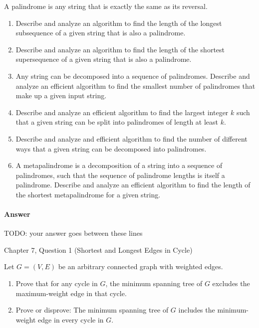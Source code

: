 \documentclass{article}
\begin{document}
A palindrome is any string that is exactly the same as its reversal.
\begin{enumerate}[label=(\alph*)]
    \item Describe and analyze an algorithm to find the length of the longest subsequence of a given string that is also a palindrome.
    \item Describe and analyze an algorithm to find the length of the shortest supersequence of a given string that is also a palindrome.
    \item Any string can be decomposed into a sequence of palindromes.
    Describe and analyze an efficient algorithm to find the smallest number of palindromes that make up a given input string.
    \item Describe and analyze an efficient algorithm to find the largest integer $k$ such that a given string can be split into palindromes of length at least $k$.
    \item Describe and analyze and efficient algorithm to find the number of different ways that a given string can be decomposed into palindromes.
    \item A metapalindrome is a decomposition of a string into a sequence of palindromes, such that the sequence of palindrome lengths is itself a palindrome.
    Describe and analyze an efficient algorithm to find the length of the shortest metapalindrome for a given string.
\end{enumerate}

\paragraph{Answer}


TODO: your answer goes between these lines


\nextprob
{}

Chapter 7, Question 1 (Shortest and Longest Edges in Cycle)

Let $G = (V, E)$ be an arbitrary connected graph with weighted edges.
\begin{enumerate}[label=(\alph*)]
    \item Prove that for any cycle in $G$, the minimum spanning tree of $G$ excludes the maximum-weight edge in that cycle.
    \item Prove or disprove: The minimum spanning tree of $G$ includes the minimum-weight edge in every cycle in $G$.
\end{enumerate}
\end{document}
